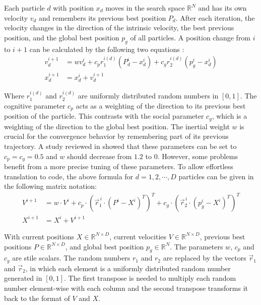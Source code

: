 \documentclass[
  oneside]{book}
\begin{document}
Each particle \(d\) with position \(x_d\) moves in the search space \(\mathbb{R}^N\) and has its own velocity \(v_d\) and remembers its previous best position \(P_d\). After each iteration, the velocity changes in the direction of the intrinsic velocity, the best previous position, and the global best position \(p_g\) of all particles. A position change from \(i\) to \(i+1\) can be calculated by the following two equations \citep{PaVr2002}:
\[
\begin{aligned}
  v_d^{i+1} &= wv_d^{i} + c_p r_1^{i(d)} (P_d^i - x_d^i) + c_g r_2^{i(d)} (p_g^i - x_d^i) \\
  x_d^{i+1} &= x_d^i + v_d^{i+1}
\end{aligned}
\]

Where \(r_1^{i(d)}\) and \(r_2^{i(d)}\) are uniformly distributed random numbers in \([0, 1]\). The cognitive parameter \(c_p\) acts as a weighting of the direction to its previous best position of the particle. This contrasts with the social parameter \(c_g\), which is a weighting of the direction to the global best position. The inertial weight \(w\) is crucial for the convergence behavior by remembering part of its previous trajectory. A study reviewed in \citep{PaVr2002} showed that these parameters can be set to \(c_p=c_g=0.5\) and \(w\) should decrease from \(1.2\) to \(0\). However, some problems benefit from a more precise tuning of these parameters. To allow effortless translation to code, the above formula for \(d = 1, 2, \cdots, D\) particles can be given in the following matrix notation:
\[
\begin{aligned}
  V^{i+1} &= w \cdot V^{i} + c_p \cdot (\vec{r}_1^{\,i} \cdot (P^i-X^i)^T)^T + c_g \cdot (\vec{r}_2^{\,i} \cdot (p_g^i - X^i)^T)^T \\
  X^{i+1} &= X^i + V^{i+1}
\end{aligned}
\]

With current positions \(X \in \mathbb{R}^{N \times D}\), current velocities \(V \in \mathbb{R}^{N \times D}\), previous best positions \(P \in \mathbb{R}^{N \times D}\), and global best position \(p_g \in \mathbb{R}^{N}\). The parameters \(w\), \(c_p\) and \(c_g\) are stile scalars. The random numbers \(r_1\) and \(r_2\) are replaced by the vectors \(\vec{r}_1\) and \(\vec{r}_2\), in which each element is a uniformly distributed random number generated in \([0, 1]\). The first transpose is needed to multiply each random number element-wise with each column and the second transpose transforms it back to the format of \(V\) and \(X\).
\end{document}
